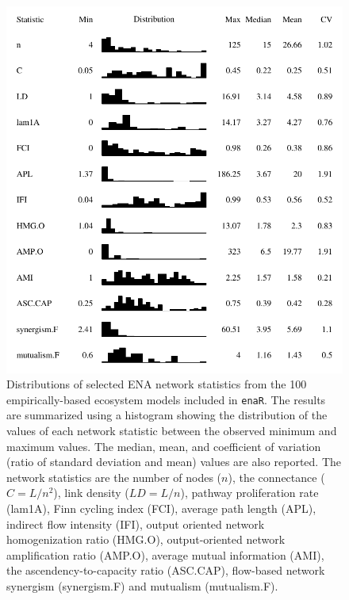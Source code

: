 \documentclass[11pt]{article}
\newcommand{\enaR}{\texttt{enaR}}
\begin{document}
\begin{figure}[t]
\includegraphics[scale=1]{../figures/ns_dist.pdf}
\caption{Distributions of selected ENA network statistics from the
  100 empirically-based ecosystem models included in \enaR.  The
  results are summarized using a histogram showing the distribution of
  the values of each network statistic between the observed minimum
  and maximum values.  The median, mean, and coefficient of variation
  (ratio of standard deviation and mean) values are also reported.
  The network statistics are the number of nodes ($n$), the
  connectance ($C = L/n^2$), link density ($LD = L/n$), pathway
  proliferation rate (lam1A), Finn cycling index (FCI), average path
  length (APL), indirect flow intensity (IFI), output oriented network
  homogenization ratio (HMG.O), output-oriented network amplification
  ratio (AMP.O), average mutual information (AMI), the
  ascendency-to-capacity ratio (ASC.CAP), flow-based network synergism
  (synergism.F) and mutualism (mutualism.F).} \label{fig:ns}
\end{figure}
\end{document}

